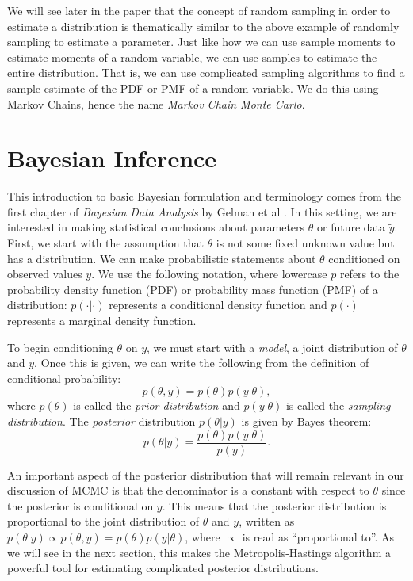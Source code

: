 \documentclass[11pt]{amsart}
\theoremstyle{theorem} %
\theoremstyle{definition}                  %
\theoremstyle{example}                       %
\theoremstyle{remark}                       %
\numberwithin{equation}{section}
\begin{document}
We will see later in the paper that the concept of random sampling in order to estimate a distribution is thematically similar to the above example of randomly sampling to estimate a parameter. Just like how we can use sample moments to estimate moments of a random variable, we can use samples to estimate the entire distribution. That is, we can use complicated sampling algorithms to find a sample estimate of the PDF or PMF of a random variable. We do this using Markov Chains, hence the name \emph{Markov Chain Monte Carlo}.

\section{Bayesian Inference}

\label{section:bayesian}

This introduction to basic Bayesian formulation and terminology comes from the first chapter of \emph{Bayesian Data Analysis} by Gelman et al \cite{gelman}. In this setting, we are interested in making statistical conclusions about parameters $\theta$ or future data $\widetilde{y}$. First, we start with the assumption that $\theta$ is not some fixed unknown value but has a distribution. We can make probabilistic statements about $\theta$ conditioned on observed values $y$. We use the following notation, where lowercase $p$ refers to the probability density function (PDF) or probability mass function (PMF) of a distribution:
$p(\cdot | \cdot)$ represents a conditional density function and $p(\cdot)$ represents a marginal density function.

To begin conditioning $\theta$ on $y$, we must start with a \emph{model}, a joint distribution of $\theta$ and $y$. Once this is given, we can write the following from the definition of conditional probability:
\[p(\theta , y) = p(\theta) p(y| \theta),\]
where $p(\theta)$ is called the \emph{prior distribution} and $p(y| \theta)$ is called the \emph{sampling distribution}. The \emph{posterior} distribution $p(\theta|y)$ is given by Bayes theorem:
\[p(\theta |y) = \frac{p(\theta) p(y| \theta)}{p(y)}.\]

An important aspect of the posterior distribution that will remain relevant in our discussion of MCMC is that the denominator is a constant with respect to $\theta$ since the posterior is conditional on $y$. This means that the posterior distribution is proportional to the joint distribution of $\theta$ and $y$, written as $p(\theta|y)\propto p(\theta , y) = p(\theta) p(y| \theta)$, where $\propto$ is read as ``proportional to''. As we will see in the next section, this makes the Metropolis-Hastings algorithm a powerful tool for estimating complicated posterior distributions.
\end{document}
